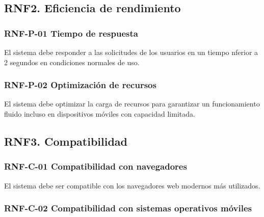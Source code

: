 \subsection{RNF2. Eficiencia de rendimiento}

\vspace{-0.75em}
\subsubsection{RNF-P-01 Tiempo de respuesta}
\vspace{-1em}

El sistema debe responder a las solicitudes de los usuarios en un tiempo nferior a 2 segundos en condiciones normales de uso.

\vspace{-0.75em}
\subsubsection{RNF-P-02 Optimización de recursos}
\vspace{-1em}

El sistema debe optimizar la carga de recursos para garantizar un funcionamiento fluido incluso en dispositivos móviles con capacidad limitada.

\subsection{RNF3. Compatibilidad}

\vspace{-0.75em}
\subsubsection{RNF-C-01 Compatibilidad con navegadores}
\vspace{-1em}

El sistema debe ser compatible con los navegadores web modernos más utilizados.

\vspace{-0.75em}
\subsubsection{RNF-C-02 Compatibilidad con sistemas operativos móviles}
\vspace{-1em}

